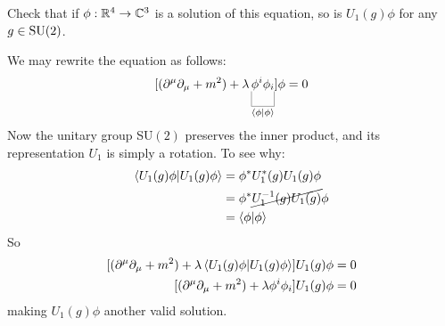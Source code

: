 \documentclass[10pt]{article}
\begin{document}
\begin{example}
	Check that if $\phi:\mathbb{R}^4\to\mathbb{C}^3$ is a solution of this equation, so is $U_1(g)\phi$ for any $g\in\text{SU}(2)$.
\end{example}
\sol We may rewrite the equation as follows:
$$
\sparen{(\partial^\mu\partial_\mu+m^2) + \lambda \ub{\phi^i\phi_i}{\ip{\phi}}}\phi=0
$$
Now the unitary group SU$(2)$ preserves the inner product, and its representation $U_1$ is simply a rotation. To see why:
$$\begin{aligned}
	\ip{U_1(g)\phi}&=\phi^*U_1^*(g)U_1(g)\phi\\&=\phi^*\cancel{U_1^{-1}(g)U_1(g)}\phi\\&=\ip{\phi}
\end{aligned}
$$
So
$$
\begin{aligned}
	\sparen{(\partial^\mu\partial_\mu+m^2) + \lambda \ip{U_1(g)\phi}}U_1(g)\phi&=0\\
	\sparen{(\partial^\mu\partial_\mu+m^2) + \lambda \phi^i\phi_i}U_1(g)\phi&=0
\end{aligned}
$$
making $U_1(g)\phi$ another valid solution.
\end{document}
